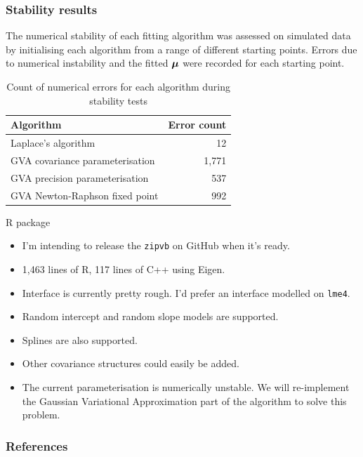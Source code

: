 \documentclass{beamer}
\begin{document}
			
	\begin{frame}
		\frametitle{Stability results}
				
				
		The numerical stability of each fitting algorithm was assessed on simulated data by initialising
		each algorithm from a range of different starting points. Errors due to numerical instability and the fitted
		${\boldsymbol \mu}$ were recorded for each starting point.
				
		\begin{table}
			\caption{Count of numerical errors for each algorithm during stability tests}
			\label{tab:stability_results}
			\begin{tabular}{|l|r|}
				\hline
				Algorithm                       & Error count \\
				\hline
				Laplace's algorithm             & 12          \\
				GVA covariance parameterisation & 1,771       \\
				GVA precision parameterisation  & 537         \\
				GVA Newton-Raphson fixed point  & 992         \\
				\hline
			\end{tabular}
		\end{table}
	\end{frame}
		
	\begin{frame}{R package}
		\begin{itemize}
			\item I'm intending to release the \texttt{zipvb} on GitHub when it's ready.
			\item 1,463 lines of R, 117 lines of C++ using Eigen.
			\item Interface is currently pretty rough. I'd prefer an interface modelled on \texttt{lme4}.
			\item Random intercept and random slope models are supported.
			\item Splines are also supported.
			\item Other covariance structures could easily be added.
			\item The current parameterisation is numerically unstable. We will re-implement the Gaussian
			      Variational Approximation part of the algorithm to solve this problem.
		\end{itemize}	
	\end{frame}
			
	\begin{frame}
		\frametitle{References}
		
		
	\end{frame}

			
\end{document}
